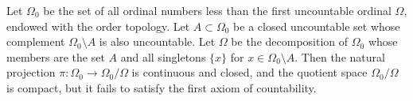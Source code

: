 Let $\Omega_0$ be the set of all ordinal numbers less than the first uncountable ordinal $\Omega$, endowed with the order topology. Let $A \subset \Omega_0$ be a closed uncountable set whose complement $\Omega_0 \setminus A$ is also uncountable. Let $\Omega$ be the decomposition of $\Omega_0$ whose members are the set $A$ and all singletons $\{x\}$ for $x \in \Omega_0 \setminus A$. Then the natural projection $\pi : \Omega_0 \to \Omega_0/\Omega$ is continuous and closed, and the quotient space $\Omega_0/\Omega$ is compact, but it fails to satisfy the first axiom of countability.
